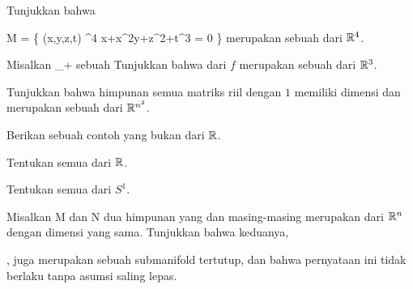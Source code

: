 \setcounter{section}{10}


{}
{

Tunjukkan bahwa

\mavergleichskettedisp
{\vergleichskette
{M
}
{ =} { \left\{ (x,y,z,t) \in \R^4  \mid   x+x^2y+z^2+t^3 = 0         \right\}
}
{ } {
}
{ } {
}
{ } {
}
}
{}{}{}
merupakan sebuah
dari ${\mathbb R}^4$.

}
{} {}

{}
{

Misalkan
 {\R} {\R_+
} {}
sebuah
Tunjukkan bahwa
dari
$f$ merupakan sebuah
dari ${\mathbb R}^{3}$.

}
{} {}

{}
{

Tunjukkan bahwa himpunan semua
 matriks riil dengan
$1$ memiliki dimensi
 dan merupakan sebuah
dari ${\mathbb R}^{n^2}$.

}
{} {}

{}
{

Berikan sebuah contoh
 yang bukan
 dari ${\mathbb R}$.

}
{} {}

{}
{

Tentukan semua
dari ${\mathbb R}$.

}
{} {}

{}
{

Tentukan semua
dari $S^1$.

}
{} {}

{}
{

Misalkan
\mathkor {} {M} {dan} {N} {}
dua himpunan yang
dan masing-masing merupakan
dari ${\mathbb R}^n$ dengan dimensi yang sama. Tunjukkan bahwa
keduanya,

, juga merupakan sebuah submanifold tertutup, dan bahwa pernyataan ini tidak berlaku tanpa asumsi saling lepas.

}
{} {}

